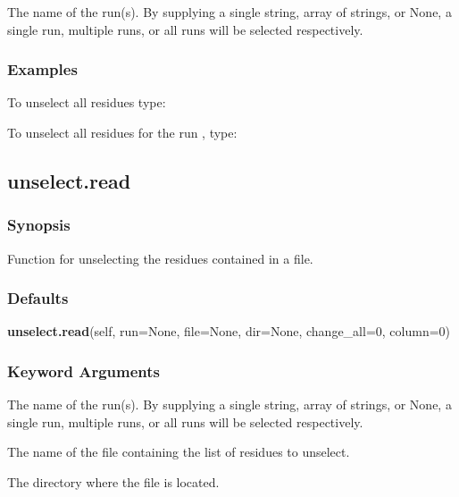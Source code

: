    The name of the run(s).  By supplying a single string, array of strings, or None, a single run, multiple runs, or all runs will be selected respectively.  

  

  
 \subsubsection{Examples} 

 To unselect all residues type: 
  


 To unselect all residues for the run , type: 
  



  

 \newpage 

 \subsection{unselect.read} 

  
 \subsubsection{Synopsis} 

 Function for unselecting the residues contained in a file. 
  

  
 \subsubsection{Defaults} 

 \textsf{\textbf{unselect.read}(self, run=None, file=None, dir=None, change\_all=0, column=0)} 

  
 \subsubsection{Keyword Arguments} 

   The name of the run(s).  By supplying a single string, array of strings, or None, a single run, multiple runs, or all runs will be selected respectively.   

   The name of the file containing the list of residues to unselect.   

   The directory where the file is located.   

